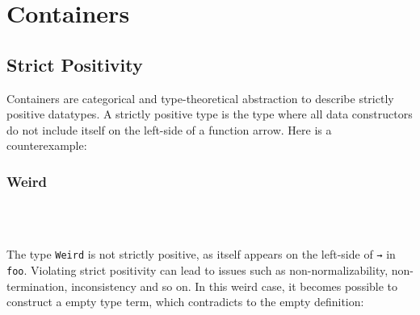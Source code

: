 {\section{Containers}

\subsection{Strict Positivity}

Containers are categorical and type-theoretical abstraction to describe strictly positive datatypes. A strictly positive type is the type where all data constructors do not include itself on the left-side of a function arrow. Here is a counterexample:

\subsubsection*{Weird}

\begin{code}%
\>[0]\AgdaSymbol{\{-\#}\AgdaSpace{}%
\AgdaSpace{}%
\AgdaSymbol{\#-\}}\<%
\\
\>[0]\AgdaSpace{}%
\AgdaSpace{}%
\AgdaSymbol{:}\AgdaSpace{}%
\AgdaSpace{}%
\<%
\\
\>[0][@{}l@{\AgdaIndent{0}}]%
\>[2]\AgdaSpace{}%
\AgdaSymbol{:}\AgdaSpace{}%
\AgdaSymbol{(}\AgdaSpace{}%
\AgdaSpace{}%
\AgdaSymbol{)}\AgdaSpace{}%
\AgdaSpace{}%
\<%
\end{code}

The type \texttt{Weird} is not strictly positive, as itself appears on the left-side of \texttt{→} in \texttt{foo}. Violating strict positivity can lead to issues such as non-normalizability, non-termination, inconsistency and so on. In this weird case, it becomes possible to construct a empty type term, which contradicts to the empty definition:

\begin{code}%
\>[0]\AgdaSpace{}%
\AgdaSymbol{:}\AgdaSpace{}%
\AgdaSpace{}%
\AgdaSpace{}%
\<%
\\
\>[0]\AgdaSpace{}%
\AgdaSymbol{(}\AgdaSpace{}%
\AgdaSymbol{)}\AgdaSpace{}%
\AgdaSymbol{=}\AgdaSpace{}%
\AgdaSpace{}%
\AgdaSymbol{(}\AgdaSpace{}%
\AgdaSymbol{)}\<%
\\
%
\\[\AgdaEmptyExtraSkip]%
\>[0]\AgdaSpace{}%
\AgdaSymbol{:}\AgdaSpace{}%
\<%
\\
\>[0]\AgdaSpace{}%
\AgdaSymbol{=}\AgdaSpace{}%
\AgdaSpace{}%
\AgdaSymbol{(}\AgdaSpace{}%
\AgdaSymbol{)}\<%
\end{code}

}
